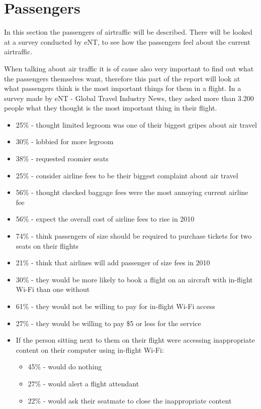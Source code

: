 \section{Passengers}

In this section the passengers of airtraffic will be described. There will be looked at a survey conducted by eNT, to see how the passengers feel about the current airtraffic.

When talking about air traffic it is of cause also very important to find out what the passengers themselves want, therefore this part of the report will look at what passengers think is the most important things for them in a flight.
In a survey made by eNT - Global Travel Industry News, they asked more than 3.200 people what they thought is the most important thing in their flight.
\begin{itemize}
\item 25\% - thought limited legroom was one of their biggest gripes about air travel
\item 30\% - lobbied for more legroom
\item 38\% - requested roomier seats
\item 25\% - consider airline fees to be their biggest complaint about air travel
\item 56\% - thought checked baggage fees were the most annoying current airline fee
\item 56\% - expect the overall cost of airline fees to rise in 2010
\item 74\% - think passengers of size should be required to purchase tickets for two seats on their flights
\item 21\% - think that airlines will add passenger of size fees in 2010
\item 30\% - they would be more likely to book a flight on an aircraft with in-flight Wi-Fi than one without
\item 61\% - they would not be willing to pay for in-flight Wi-Fi access
\item 27\% - they would be willing to pay \$5 or less for the service
\item If the person sitting next to them on their flight were accessing inappropriate content on their computer using in-flight Wi-Fi:
\begin{itemize}
\item 45\% - would do nothing
\item 27\% - would alert a flight attendant
\item 22\% - would ask their seatmate to close the inappropriate content

\end{itemize}
\end{itemize}
